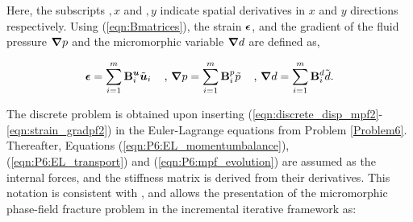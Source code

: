 \documentclass[11pt]{article}
\begin{document}
\noindent Here, the subscripts $,x$ and $,y$ indicate spatial derivatives in $x$ and $y$ directions respectively. Using (\ref{eqn:Bmatrices}), the strain $\hbox{$\hbox{\boldmath$\epsilon$}$}$, and the gradient of the fluid pressure $\hbox{\boldmath$\nabla$} p$ and the micromorphic variable $\hbox{\boldmath$\nabla$}\hbox{$d$}$ are defined as,

\begin{equation}\label{eqn:strain_gradpf2}
  \boldsymbol{\epsilon} = \sum\limits_{i = 1}^m {\mathbf{B}_i^{\boldsymbol{u}} \tilde{\boldsymbol{u}}_i}\;\;\;\text{ , }
\hbox{\boldmath$\nabla$} p = \sum\limits_{i = 1}^m {\mathbf{B}_i^{p} \tilde{p}}\;\;\;\text{ , }
\hbox{\boldmath$\nabla$}\hbox{$d$} = \sum\limits_{i = 1}^m {\mathbf{B}_i^{d} \tilde{\hbox{$d$}}}.
\end{equation}

\noindent The discrete problem is obtained upon inserting (\ref{eqn:discrete_disp_mpf2}-\ref{eqn:strain_gradpf2}) in the Euler-Lagrange equations from Problem \ref{Problem6}. Thereafter, Equations (\ref{eqn:P6:EL_momentumbalance}), (\ref{eqn:P6:EL_transport}) and (\ref{eqn:P6:mpf_evolution}) are assumed as the internal forces, and the stiffness matrix is derived from their derivatives. This notation is consistent with \cite{de2012nonlinear}, and allows the presentation of the micromorphic phase-field fracture problem in the incremental iterative framework as:
\end{document}
